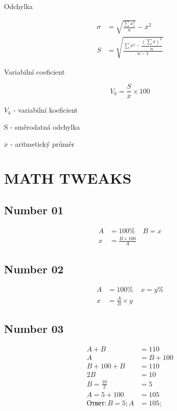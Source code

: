 \documentclass[a4paper,12pt]{article}
\begin{document}
Odchylka

\begin{align*}
\sigma &= \sqrt{\frac{\sum x^2_{i}}{n}} - \overline{x}^2 \\
S &= \sqrt{\frac{\sum x^2 - \dfrac{(\sum x)^2}{n}}{n - 1}}
\end{align*}

Variabilní coeficient

\[
V_{k} = \dfrac{S}{\overline{x}} \times 100
\]


$V_{k}$ - variabilní koeficient

S - směrodatná odchylka

$\overline{x}$ - aritmetický průměr




\newpage
\section{MATH TWEAKS}


\subsection{Number 01}
\begin{align*}
	A &= 100\% ~~~~~
	B = x \\
	x &= \frac{B \times 100}{A}
\end{align*}

\subsection{Number 02}
\begin{align*}
A &= 100\% ~~~~~
x = y\% \\
x &= \frac{A}{B} \times y
\end{align*}

\subsection{Number 03}
\begin{align*}
A + B &= 110 \\
A &= B + 100 \\
B + 100 + B &= 110 \\
2B &= 10 \\
B = \frac{10}{2} &= 5 \\
A = 5 + 100 &= 105 \\
Ответ:
B = 5; A &= 105;
\end{align*}
\end{document}

